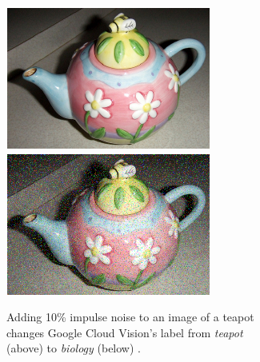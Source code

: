 \begin{figure}[p]
  \centering
  \begin{subfigure}[b]{0.4\linewidth}
    \centering
    \includegraphics[width=\linewidth]{adversarial-teapot-org}\\
    \includegraphics[width=\linewidth]{adversarial-teapot-noisy}
    \caption{Adding 10\% impulse noise to an image of a teapot changes Google Cloud Vision's label from \textit{teapot} (above) to \textit{biology} (below) \citep{Hosseini:2018jr}.}
  \end{subfigure}
  ~
  \begin{subfigure}[b]{0.4\linewidth}
    \centering

\end{subfigure}
\end{figure}
